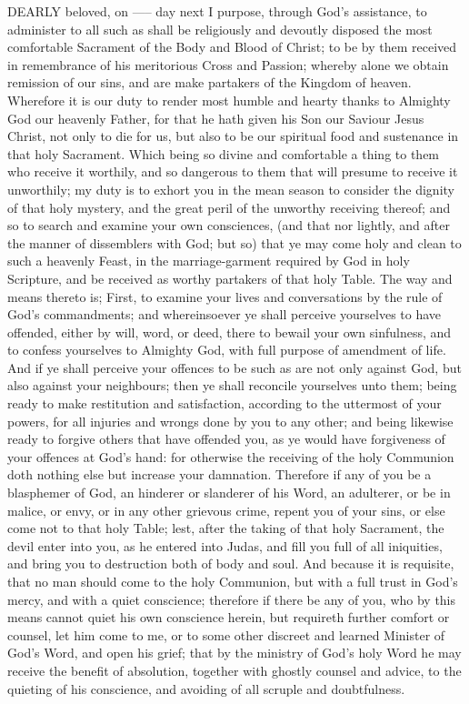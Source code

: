 DEARLY beloved, on ----- day next I purpose, through God's assistance, to administer to all such as shall be religiously and devoutly disposed the most comfortable Sacrament of the Body and Blood of Christ; to be by them received in remembrance of his meritorious Cross and Passion; whereby alone we obtain remission of our sins, and are make partakers of the Kingdom of heaven. Wherefore it is our duty to render most humble and hearty thanks to Almighty God our heavenly Father, for that he hath given his Son our Saviour Jesus Christ, not only to die for us, but also to be our spiritual food and sustenance in that holy Sacrament. Which being so divine and comfortable a thing to them who receive it worthily, and so dangerous to them that will presume to receive it unworthily; my duty is to exhort you in the mean season to consider the dignity of that holy mystery, and the great peril of the unworthy receiving thereof; and so to search and examine your own consciences, (and that nor lightly, and after the manner of dissemblers with God; but so) that ye may come holy and clean to such a heavenly Feast, in the marriage-garment required by God in holy Scripture, and be received as worthy partakers of that holy Table.
    The way and means thereto is; First, to examine your lives and conversations by the rule of God's commandments; and whereinsoever ye shall perceive yourselves to have offended, either by will, word, or deed, there to bewail your own sinfulness, and to confess yourselves to Almighty God, with full purpose of amendment of life. And if ye shall perceive your offences to be such as are not only against God, but also against your neighbours; then ye shall reconcile yourselves unto them; being ready to make restitution and satisfaction, according to the uttermost of your powers, for all injuries and wrongs done by you to any other; and being likewise ready to forgive others that have offended you, as ye would have forgiveness of your offences at God's hand: for otherwise the receiving of the holy Communion doth nothing else but increase your damnation. Therefore if any of you be a blasphemer of God, an hinderer or slanderer of his Word, an adulterer, or be in malice, or envy, or in any other grievous crime, repent you of your sins, or else come not to that holy Table; lest, after the taking of that holy Sacrament, the devil enter into you, as he entered into Judas, and fill you full of all iniquities, and bring you to destruction both of body and soul.
    And because it is requisite, that no man should come to the holy Communion, but with a full trust in God's mercy, and with a quiet conscience; therefore if there be any of you, who by this means cannot quiet his own conscience herein, but requireth further comfort or counsel, let him come to me, or to some other discreet and learned Minister of God's Word, and open his grief; that by the ministry of God's holy Word he may receive the benefit of absolution, together with ghostly counsel and advice, to the quieting of his conscience, and avoiding of all scruple and doubtfulness.

